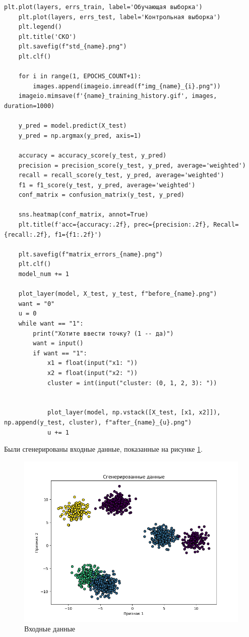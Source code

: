 \documentclass[12pt]{report}
\begin{document}
\begin{lstlisting}[label=lst:gen1,caption=Код классификации]
    plt.plot(layers, errs_train, label='Обучающая выборка')
    plt.plot(layers, errs_test, label='Контрольная выборка')
    plt.legend()
    plt.title('СКО')
    plt.savefig(f"std_{name}.png")
    plt.clf()
    
    for i in range(1, EPOCHS_COUNT+1):
        images.append(imageio.imread(f"img_{name}_{i}.png"))
    imageio.mimsave(f'{name}_training_history.gif', images, duration=1000)

    y_pred = model.predict(X_test)
    y_pred = np.argmax(y_pred, axis=1)

    accuracy = accuracy_score(y_test, y_pred)
    precision = precision_score(y_test, y_pred, average='weighted')
    recall = recall_score(y_test, y_pred, average='weighted')
    f1 = f1_score(y_test, y_pred, average='weighted')
    conf_matrix = confusion_matrix(y_test, y_pred)

    sns.heatmap(conf_matrix, annot=True)
    plt.title(f'acc={accuracy:.2f}, prec={precision:.2f}, Recall={recall:.2f}, f1={f1:.2f}')

    plt.savefig(f"matrix_errors_{name}.png")
    plt.clf()
    model_num += 1

    plot_layer(model, X_test, y_test, f"before_{name}.png")
    want = "0"
    u = 0
    while want == "1":
        print("Хотите ввести точку? (1 -- да)")
        want = input()
        if want == "1":
            x1 = float(input("x1: "))
            x2 = float(input("x2: "))
            cluster = int(input("cluster: (0, 1, 2, 3): "))
            
            
            plot_layer(model, np.vstack([X_test, [x1, x2]]), np.append(y_test, cluster), f"after_{name}_{u}.png")
            u += 1
\end{lstlisting}

Были сгенерированы входные данные, показанные на рисунке \ref{fig:data}.

\begin{figure}[h!]
  \centering
  \includegraphics[width = \linewidth]{data_viz.png}
  \caption{Входные данные}
  \label{fig:data}
\end{figure}
\end{document}
